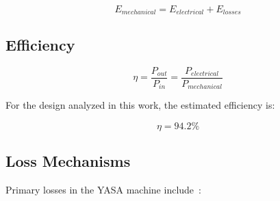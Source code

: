 \documentclass[12pt,a4paper]{article}
\begin{document}
\begin{equation}
E_{mechanical} = E_{electrical} + E_{losses}
\end{equation}

\subsection{Efficiency}
\begin{equation}
\eta = \frac{P_{out}}{P_{in}} = \frac{P_{electrical}}{P_{mechanical}}
\end{equation}

For the design analyzed in this work, the estimated efficiency is:

\begin{equation}
\eta = 94.2\%
\end{equation}

\subsection{Loss Mechanisms}
Primary losses in the YASA machine include~\cite{ref34,ref35,ref32}:
\end{document}
